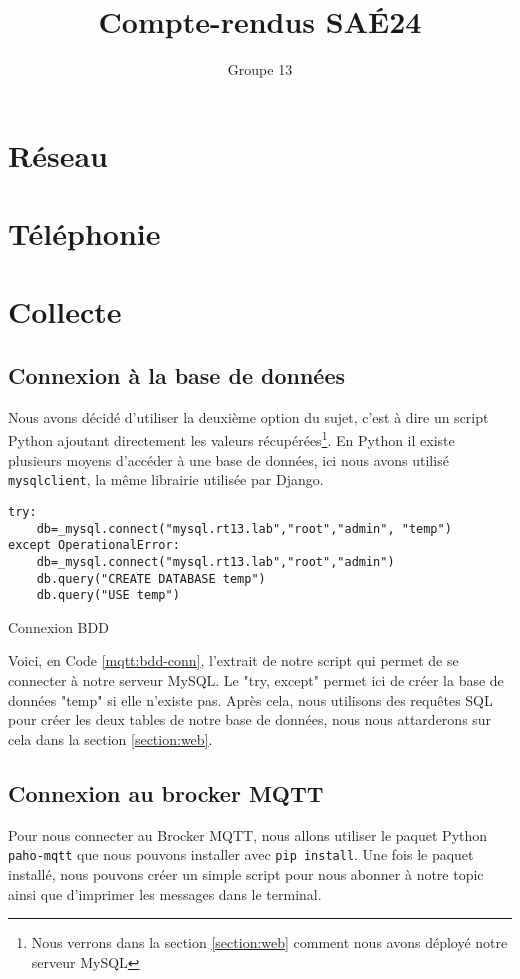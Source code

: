 \documentclass{article}
\author{Groupe 13}
\title{Compte-rendus SAÉ24}
\begin{document}
\maketitle
\tableofcontents
\newpage
\listoffigures
\newpage
\listoflistings

\newpage
\section{Réseau}

\newpage
\section{Téléphonie}

\newpage
\section{Collecte}
    \subsection{Connexion à la base de données}
    Nous avons décidé d'utiliser la deuxième option du sujet, c'est à dire un script Python ajoutant directement les valeurs récupérées\footnote{Nous verrons dans la section \ref{section:web} comment nous avons déployé notre serveur MySQL}. 
    En Python il existe plusieurs moyens d'accéder à une base de données, ici nous avons utilisé \verb|mysqlclient|, la même librairie utilisée par Django.
    \begin{listing}[H]
        \begin{verbatim}
try:
    db=_mysql.connect("mysql.rt13.lab","root","admin", "temp")
except OperationalError:
    db=_mysql.connect("mysql.rt13.lab","root","admin")
    db.query("CREATE DATABASE temp")
    db.query("USE temp")
        \end{verbatim}
        \caption{Connexion BDD}
        \label{mqtt:bdd-conn}
    \end{listing}
    Voici, en Code \ref{mqtt:bdd-conn}, l'extrait de notre script qui permet de se connecter à notre serveur MySQL. Le "try, except" permet ici de créer la base de données "temp" si elle n'existe pas. Après cela, nous utilisons des requêtes SQL pour créer les deux tables de notre base de données, nous nous attarderons sur cela dans la section \ref{section:web}.
    \subsection{Connexion au brocker MQTT}
    Pour nous connecter au Brocker MQTT, nous allons utiliser le paquet Python \verb|paho-mqtt| que nous pouvons installer avec \verb|pip install|.
    Une fois le paquet installé, nous pouvons créer un simple script pour nous abonner à notre topic ainsi que d'imprimer les messages dans le terminal.
\end{document}
